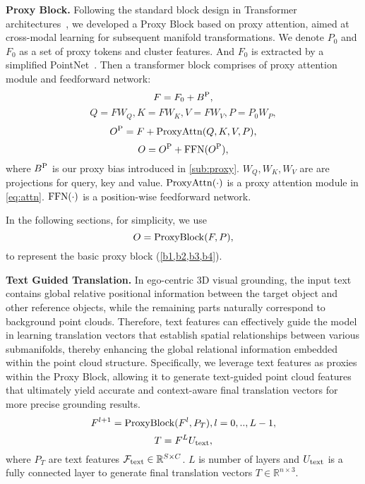 \noindent \textbf{Proxy Block.} Following the standard block design in Transformer architectures~\cite{vaswani2017attention}, we developed a Proxy Block based on proxy attention, aimed at cross-modal learning for subsequent manifold transformations. We denote $P_0$ and $F_0$ as a set of proxy tokens and cluster features. And $F_0$ is extracted by a simplified PointNet~\cite{qi2017pointnet}. Then a transformer block comprises of proxy attention module and feedforward network:
\begin{equation}\label{b1}
    F = F_0 + B^{\rm P},
\end{equation}
\begin{equation}\label{b2}
    Q = FW_Q, K = FW_K, V = FW_V, P = P_0W_P,
\end{equation}
\begin{equation}\label{b3}
    O^{\rm P} = F + {\rm ProxyAttn}(Q,K,V,P),
\end{equation}
\begin{equation}\label{b4}
    O = O^{\rm P} + {\rm FFN}(O^{\rm P}),
\end{equation}
where $B^{\rm P}$ is our proxy bias introduced in \cref{sub:proxy}. $W_Q,W_K,W_V$ are are projections for query, key and value. ${\rm ProxyAttn}(\cdot)$ is a proxy attention module in \cref{eq:attn}. ${\rm FFN}(\cdot)$ is a position-wise feedforward network.

In the following sections, for simplicity, we use
\begin{equation}
    O = {\rm ProxyBlock}(F, P),
\end{equation}
to represent the basic proxy block (\cref{b1,b2,b3,b4}).

\noindent \textbf{Text Guided Translation.}
In ego-centric 3D visual grounding, the input text contains global relative positional information between the target object and other reference objects, while the remaining parts naturally correspond to background point clouds. Therefore, text features can effectively guide the model in learning translation vectors that establish spatial relationships between various submanifolds, thereby enhancing the global relational information embedded within the point cloud structure. Specifically, we leverage text features as proxies within the Proxy Block, allowing it to generate text-guided point cloud features that ultimately yield accurate and context-aware final translation vectors for more precise grounding results.
\begin{equation}
    F^{l+1} = {\rm ProxyBlock}(F^l, P_{T}),l=0,..,L-1, 
\end{equation}
\begin{equation}
    T = F^{L}U_{\rm text},
\end{equation}
where $P_T$ are text features $\mathcal{F}_{\rm text} \in \mathbb{R}^{S \times C}$. $L$ is number of layers and $U_{\rm text}$ is a fully connected layer to generate final translation vectors $T \in \mathbb{R}^{n \times 3}$.

